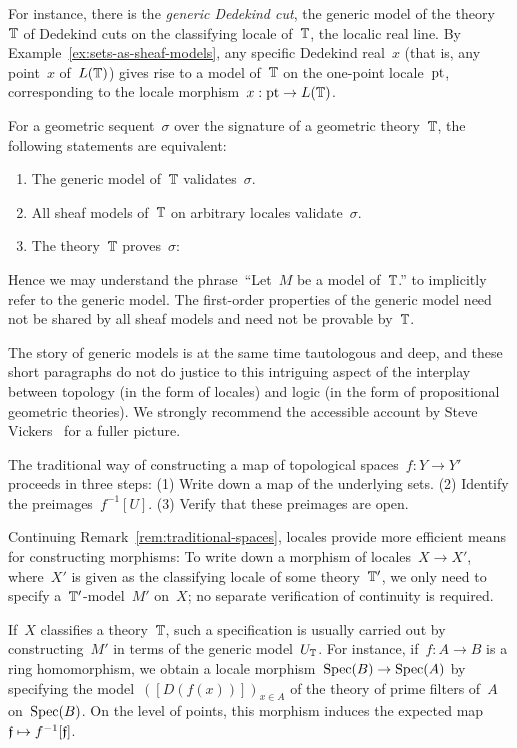\documentclass{ws-rv9x6}
\begin{document}
{For instance, there is the \emph{generic Dedekind cut}, the generic model of
the theory~$\mathbb{T}$ of Dedekind cuts on the classifying locale of~$\mathbb{T}$, the
localic real line. By Example~\ref{ex:sets-as-sheaf-models}, any specific Dedekind
real~$x$ (that is, any point~$x$ of~$L(\mathbb{T})$) gives rise to a model of~$\mathbb{T}$ on
the one-point locale~$\mathrm{pt}$, corresponding to the locale morphism~$x : \mathrm{pt} \to
L(\mathbb{T})$.

For a geometric sequent~$\sigma$ over the signature of a geometric
theory~$\mathbb{T}$, the following statements are equivalent:
\begin{enumerate}
\item The generic model of~$\mathbb{T}$ validates~$\sigma$.
\item All sheaf models of~$\mathbb{T}$ on arbitrary locales validate~$\sigma$.
\item The theory~$\mathbb{T}$ proves~$\sigma$:
\end{enumerate}
Hence we may understand the phrase~``Let~$M$ be a model of~$\mathbb{T}$.'' to
implicitly refer to the generic model. The first-order properties of the
generic model need not be shared by all sheaf models and need not be provable
by~$\mathbb{T}$.

The story of generic models is at the same time tautologous and deep, and these
short paragraphs do not do justice to this intriguing aspect of the interplay
between topology (in the form of locales) and logic (in the form of
propositional geometric theories). We strongly
recommend the accessible account by Steve Vickers~\cite{vickers:continuity} for a fuller
picture.

\begin{remark}The traditional way of constructing a map of topological spaces~$f : Y \to
Y'$ proceeds in three steps: (1) Write down a map of the underlying sets. (2)
Identify the preimages~$f^{-1}[U]$. (3) Verify that these preimages are open.

Continuing Remark~\ref{rem:traditional-spaces}, locales provide more
efficient means for constructing morphisms: To write down a morphism of
locales~$X \to X'$, where~$X'$ is given as the classifying locale of some
theory~$\mathbb{T}'$, we only need to specify a~$\mathbb{T}'$-model~$M'$ on~$X$; no separate
verification of continuity is required.

If~$X$ classifies a theory~$\mathbb{T}$, such a specification is usually carried out
by constructing~$M'$ in terms of the generic model~$U_{\mathbb{T}}$.
For instance, if~$f : A \to B$ is a ring homomorphism, we obtain a locale
morphism~$\mathrm{Spec}(B) \to \mathrm{Spec}(A)$ by specifying the model~$([D(f(x))])_{x \in
A}$ of the theory of prime filters of~$A$ on~$\mathrm{Spec}(B)$. On the level of
points, this morphism induces the expected map~$\mathfrak{f} \mapsto f^{-1}[\mathfrak{f}]$.
\end{remark}


}
\end{document}
